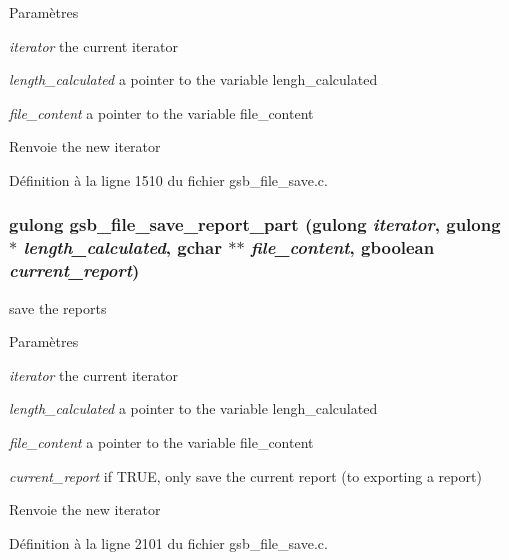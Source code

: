 \begin{DoxyParams}{Paramètres}
\item[{\em iterator}]the current iterator \item[{\em length\_\-calculated}]a pointer to the variable lengh\_\-calculated \item[{\em file\_\-content}]a pointer to the variable file\_\-content\end{DoxyParams}
\begin{DoxyReturn}{Renvoie}
the new iterator 
\end{DoxyReturn}


Définition à la ligne 1510 du fichier gsb\_\-file\_\-save.c.

\subsubsection[{gsb\_\-file\_\-save\_\-report\_\-part}]{\setlength{\rightskip}{0pt plus 5cm}gulong gsb\_\-file\_\-save\_\-report\_\-part (gulong {\em iterator}, \/  gulong $\ast$ {\em length\_\-calculated}, \/  gchar $\ast$$\ast$ {\em file\_\-content}, \/  gboolean {\em current\_\-report})}\label{gsb__file__save_8h_a3699f6e4d341e96824d32c5df54f6e8a}
save the reports


\begin{DoxyParams}{Paramètres}
\item[{\em iterator}]the current iterator \item[{\em length\_\-calculated}]a pointer to the variable lengh\_\-calculated \item[{\em file\_\-content}]a pointer to the variable file\_\-content \item[{\em current\_\-report}]if TRUE, only save the current report (to exporting a report)\end{DoxyParams}
\begin{DoxyReturn}{Renvoie}
the new iterator 
\end{DoxyReturn}


Définition à la ligne 2101 du fichier gsb\_\-file\_\-save.c.

